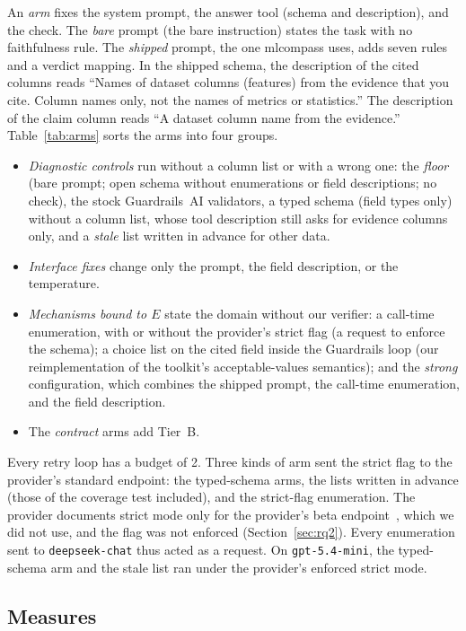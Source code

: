 \documentclass[journal]{IEEEtran}
\begin{document}
An \emph{arm} fixes the system prompt, the answer tool (schema and description),
and the check. The \emph{bare} prompt (the bare instruction) states the task with
no faithfulness rule. The \emph{shipped} prompt, the one mlcompass uses, adds
seven rules and a verdict mapping. In the shipped schema, the description of the
cited columns reads ``Names of dataset columns (features) from the evidence that
you cite. Column names only, not the names of metrics or statistics.'' The
description of the claim column reads ``A dataset column name from the
evidence.'' Table~\ref{tab:arms} sorts the arms into four groups.
\begin{itemize}
\item \emph{Diagnostic controls} run without a column list or with a wrong one:
the \emph{floor} (bare prompt; open schema without enumerations or field
descriptions; no check), the stock Guardrails~AI validators, a typed schema
(field types only) without a column list, whose tool description still asks for
evidence columns only, and a \emph{stale} list written in advance for other data.
\item \emph{Interface fixes} change only the prompt, the field description, or
the temperature.
\item \emph{Mechanisms bound to $E$} state the domain without our verifier: a
call-time enumeration, with or without the provider's strict flag (a request to
enforce the schema); a choice list on the cited field inside the Guardrails loop
(our reimplementation of the toolkit's acceptable-values semantics); and the
\emph{strong} configuration, which combines the shipped prompt, the call-time
enumeration, and the field description.
\item The \emph{contract} arms add Tier~B.
\end{itemize}
Every retry loop has a budget of 2. Three kinds of arm sent the strict flag to
the provider's standard endpoint: the typed-schema arms, the lists written in
advance (those of the coverage test included), and the strict-flag enumeration.
The provider documents strict mode only for the provider's beta
endpoint~\cite{deepseek2026toolcalls}, which we did not use, and the flag was not
enforced (Section~\ref{sec:rq2}). Every enumeration sent to
\texttt{deepseek-chat} thus acted as a request. On \texttt{gpt-5.4-mini}, the
typed-schema arm and the stale list ran under the provider's enforced strict
mode.

\subsection{Measures}
\end{document}
